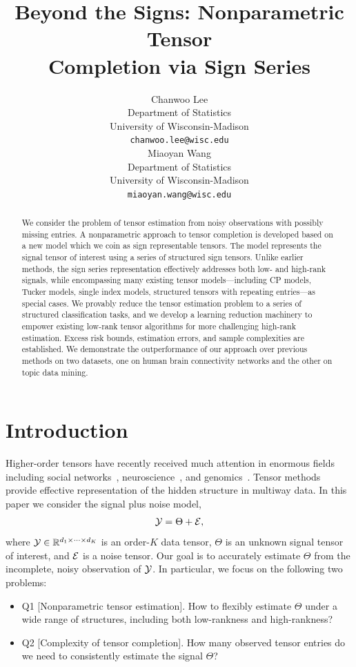 \documentclass{article}
\title{Beyond the Signs: Nonparametric Tensor \\
Completion via Sign Series}
\author{%
 Chanwoo Lee\\
  Department of Statistics\\
  University of Wisconsin-Madison\\
  \texttt{chanwoo.lee@wisc.edu} \\
   \And Miaoyan Wang \\
  Department of Statistics\\ 
   University of Wisconsin-Madison\\
   \texttt{miaoyan.wang@wisc.edu} \\
}
\theoremstyle{plain}
\theoremstyle{definition}
\begin{document}
\maketitle

\begin{abstract}
We consider the problem of tensor estimation from noisy observations with possibly missing entries. A nonparametric approach to tensor completion is developed based on a new model which we coin as sign representable tensors. The model represents the signal tensor of interest using a series of structured sign tensors. Unlike earlier methods, the sign series representation effectively addresses both low- and high-rank signals, while encompassing many existing tensor models---including CP models, Tucker models, single index models, structured tensors with repeating entries---as special cases. We provably reduce the tensor estimation problem to a series of structured classification tasks, and we develop a learning reduction machinery to empower existing low-rank tensor algorithms for more challenging high-rank estimation. Excess risk bounds, estimation errors, and sample complexities are established. We demonstrate the outperformance of our approach over previous methods on two datasets, one on human brain connectivity networks and the other on topic data mining. 
\end{abstract}

\section{Introduction}\label{sec:intro}

Higher-order tensors have recently received much attention in enormous fields including social networks~\citep{anandkumar2014tensor}, neuroscience~\citep{wang2017bayesian}, and genomics~\citep{hore2016tensor}. Tensor methods provide effective representation of the hidden structure in multiway data. In this paper we consider the signal plus noise model,
\begin{equation}\label{eq:modelintro}
\mathcal{Y}=\Theta+\mathcal{E},
\end{equation}
where $\mathcal{Y}\in\mathbb{R}^{d_1\times \cdots \times d_K}$ is an order-$K$ data tensor, $\Theta$ is an unknown signal tensor of interest, and $\mathcal{E}$ is a noise tensor. Our goal is to accurately estimate $\Theta$ from the incomplete, noisy observation of $\mathcal{Y}$. In particular, we focus on the following two problems:
\begin{itemize}[leftmargin=*,labelindent=-10pt]
\item[] Q1 [Nonparametric tensor estimation]. How to flexibly estimate $\Theta$ under a wide range of structures, including both low-rankness and high-rankness?
\item[] Q2 [Complexity of tensor completion]. How many observed tensor entries do we need to consistently estimate the signal $\Theta$?
\end{itemize}
\end{document}
